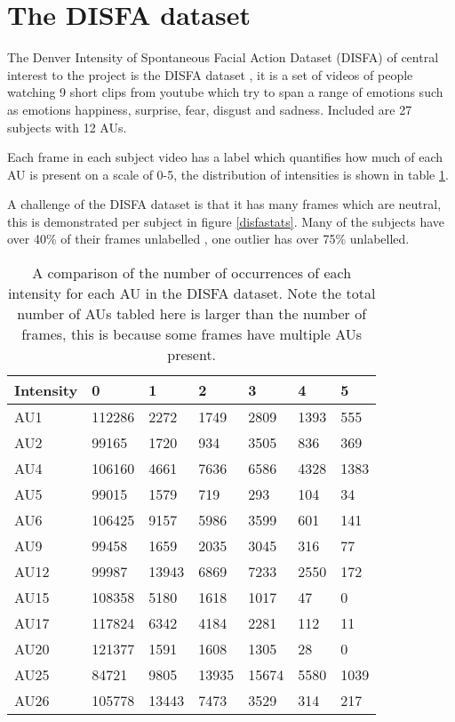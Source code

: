 \section{The DISFA dataset} \label{disfa_list}
The Denver Intensity of Spontaneous Facial Action Dataset (DISFA)
of central interest to the project is the DISFA dataset \cite{disfa}, it is a set
of videos of people watching 9 short clips from youtube which try to span a range
of emotions such as emotions happiness, surprise, fear, disgust and sadness. Included
are 27 subjects with 12 AUs.

Each frame in each subject video has a label which quantifies how much of each
AU is present on a scale of 0-5, the distribution of intensities is shown in table \ref{compau}.

A challenge of the DISFA dataset is that it has many frames which are neutral, this is demonstrated
per subject in figure \ref{disfastats}. Many of the subjects have over 40\% of their frames unlabelled
, one outlier has over 75\% unlabelled.

\begin{table}[h!]
\centering

\begin{tabular}{lllllll}
\hline
Intensity & 0      & 1     & 2     & 3     & 4    & 5    \\ \hline
AU1       & 112286 & 2272  & 1749  & 2809  & 1393 & 555  \\
AU2       & 99165  & 1720  & 934   & 3505  & 836  & 369  \\
AU4       & 106160 & 4661  & 7636  & 6586  & 4328 & 1383 \\
AU5       & 99015  & 1579  & 719   & 293   & 104  & 34   \\
AU6       & 106425 & 9157  & 5986  & 3599  & 601  & 141  \\
AU9       & 99458  & 1659  & 2035  & 3045  & 316  & 77   \\
AU12      & 99987  & 13943 & 6869  & 7233  & 2550 & 172  \\
AU15      & 108358 & 5180  & 1618  & 1017  & 47   & 0    \\
AU17      & 117824 & 6342  & 4184  & 2281  & 112  & 11   \\
AU20      & 121377 & 1591  & 1608  & 1305  & 28   & 0    \\
AU25      & 84721  & 9805  & 13935 & 15674 & 5580 & 1039 \\
AU26      & 105778 & 13443 & 7473  & 3529  & 314  & 217  \\ \hline
\end{tabular}
\caption{A comparison of the number of occurrences of each intensity for each AU in the DISFA dataset. Note the total number
of AUs tabled here is larger than the number of frames, this is because some frames have multiple AUs present.} \label{compau}
\end{table}


